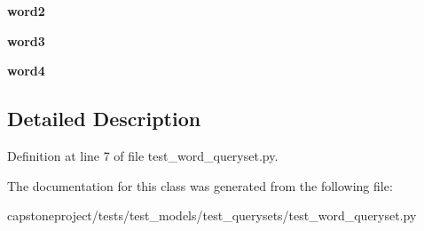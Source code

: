 \begin{DoxyCompactItemize}
\mbox{\label{classcapstoneproject_1_1tests_1_1test__models_1_1test__querysets_1_1test__word__queryset_1_1_test_word_query_set_a7092b9c4791a85dc765a495f03d8af01}} 
{\bfseries word2}
\item 
\mbox{\label{classcapstoneproject_1_1tests_1_1test__models_1_1test__querysets_1_1test__word__queryset_1_1_test_word_query_set_ae3e3eddaeba604ed4be9800028669942}} 
{\bfseries word3}
\item 
\mbox{\label{classcapstoneproject_1_1tests_1_1test__models_1_1test__querysets_1_1test__word__queryset_1_1_test_word_query_set_ae365497cd10ef09cda7224673c24a9ca}} 
{\bfseries word4}
\end{DoxyCompactItemize}


\subsection{Detailed Description}


Definition at line 7 of file test\+\_\+word\+\_\+queryset.\+py.



The documentation for this class was generated from the following file\+:\begin{DoxyCompactItemize}
\item 
capstoneproject/tests/test\+\_\+models/test\+\_\+querysets/test\+\_\+word\+\_\+queryset.\+py\end{DoxyCompactItemize}
